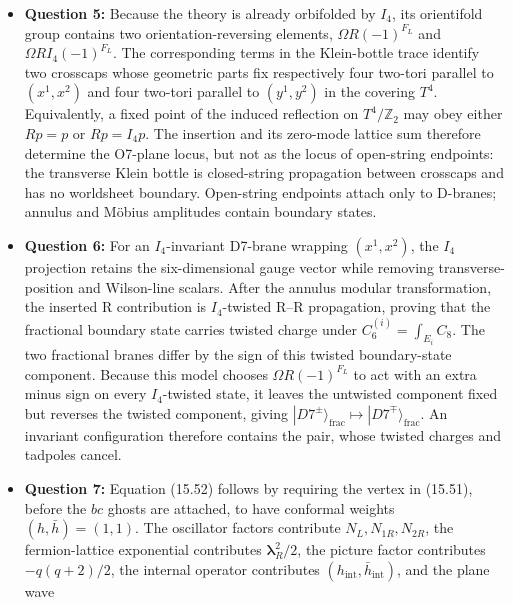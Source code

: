 \documentclass[
  10pt,
  a4paper,
  openany]{book}
\begin{document}
\begin{itemize}
  leaves, at each of the 16 fixed points, \(3(1,1)\) in NS--NS,
  \((1,1)\) in R--R, and \(2(2,1)\) in the mixed sectors. These states
  form one gravity, one tensor, and four hypermultiplets in the
  untwisted sector, plus sixteen twisted hypermultiplets.
\item
  \textbf{Question 5:} Because the theory is already orbifolded by
  \(I_4\), its orientifold group contains two orientation-reversing
  elements, \(\Omega R(-1)^{F_L}\) and \(\Omega RI_4(-1)^{F_L}\). The
  corresponding terms in the Klein-bottle trace identify two crosscaps
  whose geometric parts fix respectively four two-tori parallel to
  \((x^1,x^2)\) and four two-tori parallel to \((y^1,y^2)\) in the
  covering \(T^4\). Equivalently, a fixed point of the induced
  reflection on \(T^4/\mathbb Z_2\) may obey either \(Rp=p\) or
  \(Rp=I_4p\). The insertion and its zero-mode lattice sum therefore
  determine the O7-plane locus, but not as the locus of open-string
  endpoints: the transverse Klein bottle is closed-string propagation
  between crosscaps and has no worldsheet boundary. Open-string
  endpoints attach only to D-branes; annulus and Möbius amplitudes
  contain boundary states.
\item
  \textbf{Question 6:} For an \(I_4\)-invariant D7-brane wrapping
  \((x^1,x^2)\), the \(I_4\) projection retains the six-dimensional
  gauge vector while removing transverse-position and Wilson-line
  scalars. After the annulus modular transformation, the inserted R
  contribution is \(I_4\)-twisted R--R propagation, proving that the
  fractional boundary state carries twisted charge under
  \(C_6^{(i)}=\int_{E_i}C_8\). The two fractional branes differ by the
  sign of this twisted boundary-state component. Because this model
  chooses \(\Omega R(-1)^{F_L}\) to act with an extra minus sign on
  every \(I_4\)-twisted state, it leaves the untwisted component fixed
  but reverses the twisted component, giving
  \(|D7^\pm\rangle_{\mathrm{frac}}\mapsto|D7^\mp\rangle_{\mathrm{frac}}\).
  An invariant configuration therefore contains the pair, whose twisted
  charges and tadpoles cancel.
\item
  \textbf{Question 7:} Equation (15.52) follows by requiring the vertex
  in (15.51), before the \(bc\) ghosts are attached, to have conformal
  weights \((h,\bar h)=(1,1)\). The oscillator factors contribute
  \(N_L,N_{1R},N_{2R}\), the fermion-lattice exponential contributes
  \(\boldsymbol\lambda_R^2/2\), the picture factor contributes
  \(-q(q+2)/2\), the internal operator contributes
  \((h_{\mathrm{int}},\bar h_{\mathrm{int}})\), and the plane wave

\end{itemize}
\end{document}
